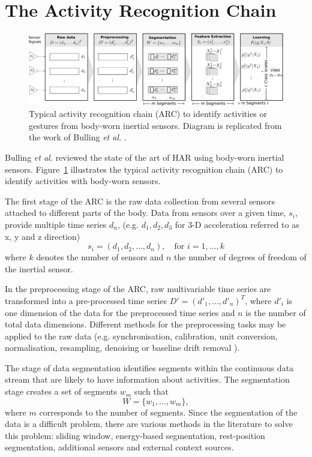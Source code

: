\documentclass[10pt,journal,compsoc]{IEEEtran}
\begin{document}
\section{The Activity Recognition Chain}
\begin{figure}
\centering    
 \includegraphics[width=\textwidth]{ARC02}
\caption[PA]{Typical activity recognition chain (ARC) to identify activities or gestures
from body-worn inertial sensors. 
Diagram is replicated from the work of Bulling \textit{et al.} \cite{bulling2014}.}
\label{fig:arc}
\end{figure}
Bulling \textit{et al.} \cite{bulling2014} reviewed the state of the art of HAR using 
body-worn inertial sensors. Figure~\ref{fig:arc} illustrates the typical 
activity recognition chain (ARC) to identify activities with 
body-worn sensors.

The first stage of the ARC is the raw data collection 
from several sensors attached to different parts of the body. 
Data from sensors over a given time, $s_i$, provide multiple time series $d_n$, 
(e.g. $d_1, d_2, d_3$ for 3-D acceleration referred to as x, y and z direction)
\begin{equation}
s_i = (d_1, d_2,\dots,d_n), \quad \mbox{for } i=1, \dots,k
\end{equation} 
where $k$ denotes the number of sensors and $n$ the number 
of degrees of freedom of the inertial sensor.

In the preprocessing stage of the ARC, raw multivariable time series 
are transformed into a pre-processed time series 
$D'= (d'_1, \dots, d'_n )^T$, where $d'_i$ is one dimension of the data 
for the preprocessed time series and $n$ is the number of total 
data dimensions. Different methods for the preprocessing 
tasks may be applied to the raw data (e.g. synchronisation, 
calibration, unit conversion, normalisation, resampling, 
denoising  or baseline drift removal \cite{bulling2014}).

The stage of data segmentation identifies segments 
within the continuous data stream that are likely to have 
information about activities. The segmentation stage creates 
a set of segments $w_m$ such that 
\begin{equation}
W = \{   w_1, \dots, w_m  \},
\end{equation} 
where $m$ corresponds to the number of segments. Since the 
segmentation of the data is a difficult problem, there are 
various methods in the literature to solve this problem: sliding 
window, energy-based segmentation, rest-position segmentation, 
additional sensors and external context sources.
\end{document}
